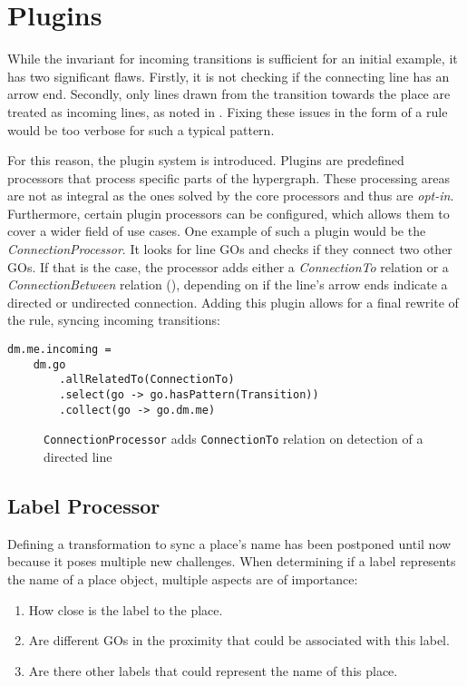 \section{Plugins}
\label{sec:plugins}
While the invariant for incoming transitions is sufficient for an initial example, it has two significant flaws. Firstly, it is not checking if the connecting line has an arrow end. Secondly, only lines drawn from the transition towards the place are treated as incoming lines, as noted in . Fixing these issues in the form of a rule would be too verbose for such a typical pattern.

For this reason, the plugin system is introduced. Plugins are predefined processors that process specific parts of the hypergraph. These processing areas are not as integral as the ones solved by the core processors and thus are \emph{opt-in}. Furthermore, certain plugin processors can be configured, which allows them to cover a wider field of use cases. One example of such a plugin would be the \emph{ConnectionProcessor}. It looks for line GOs and checks if they connect two other GOs. If that is the case, the processor adds either a \emph{ConnectionTo} relation or a \emph{ConnectionBetween} relation (), depending on if the line's arrow ends indicate a directed or undirected connection. Adding this plugin allows for a final rewrite of the rule, syncing incoming transitions:

\begin{lstlisting}[captionpos=b,caption={Final iteration of the place incoming transition rule}]
dm.me.incoming = 
    dm.go
        .allRelatedTo(ConnectionTo)
        .select(go -> go.hasPattern(Transition))
        .collect(go -> go.dm.me)
\end{lstlisting}

\begin{figure}[ht]
  \centering
  
  \caption{\texttt{ConnectionProcessor} adds \texttt{ConnectionTo} relation on detection of a directed line}
  \label{fig:transition-plugin}
\end{figure}



\subsection{Label Processor}
Defining a transformation to sync a place's name has been postponed until now because it poses multiple new challenges. When determining if a label represents the name of a place object, multiple aspects are of importance:
\begin{enumerate}
  \item How close is the label to the place.
  \item Are different GOs in the proximity that could be associated with this label.
  \item Are there other labels that could represent the name of this place.
\end{enumerate}

